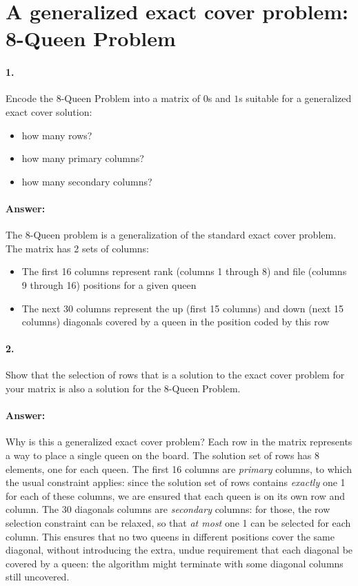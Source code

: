 \documentclass[table]{article}
\begin{document}
\section{A generalized exact cover problem: 8-Queen Problem}

\paragraph{1.} Encode the 8-Queen Problem into a matrix of $0$s and $1$s suitable for a generalized  exact cover solution:  
	\begin{itemize}
		\item how many rows?
		\item how many primary columns?
		\item how many secondary columns?
	\end{itemize}


\paragraph{Answer:} The 8-Queen problem is a generalization of the standard exact cover problem. The matrix has 2 sets of columns:
\begin{itemize}
\item The first 16 columns represent rank (columns 1 through 8)  and file (columns 9 through 16) positions for a given queen
\item The next 30 columns represent the up (first 15 columns) and down (next 15 columns) diagonals covered by a queen in the position coded by this row
\end{itemize}

\paragraph{2.} Show that the selection of rows that is a solution to the exact cover problem for your matrix is also a solution for the 8-Queen Problem.

\paragraph{Answer:} Why is this a generalized exact cover problem? Each row in the matrix represents a way to place a single queen on the board. The solution set of rows has 8 elements, one for each queen. The first 16 columns are {\em primary} columns, to which the usual constraint applies: since the solution set of rows contains {\em exactly} one 1 for each of these columns, we are ensured that each queen is on its own row and column.  The 30 diagonals columns are {\em secondary} columns: for those, the row selection constraint can be relaxed, so that {\em at most} one 1 can be selected for each  column. This ensures that no two queens in different positions cover the same diagonal, without introducing the extra, undue requirement that each diagonal  be covered by a queen: the algorithm might terminate with some diagonal columns still uncovered.
\end{document}
